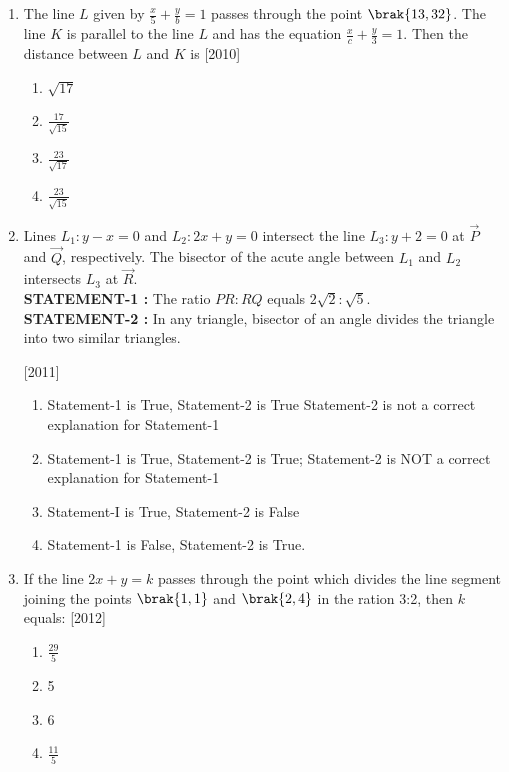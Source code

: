 \begin{enumerate}
\item The line $L$ given by $\frac{x}{5}+\frac{y}{b}=1$ passes through the point $\brak{13, 32}$. The line $K$ is parallel to the line $L$ and has the equation $\frac{x}{c}+\frac{y}{3}=1$. Then the distance between $L$ and $K$ is
\hfill{[2010]}
\begin{multicols}{4}
\begin{enumerate}
\item $\sqrt{17}$
\item $\frac{17}{\sqrt{15}}$
\item $\frac{23}{\sqrt{17}}$
\item $\frac{23}{\sqrt{15}}$
\end{enumerate}
\end{multicols} 

\item Lines $L_{1}: y-x=0$ and $L_{2}: 2x+y=0$ intersect the line $L_{3}: y+2=0$ at $\vec{P}$ and $\vec{Q}$, respectively. The bisector of the acute 
	angle between $L_{1}$ and $L_{2}$ intersects $L_{3}$ at $\vec{R}$.\\
\textbf{STATEMENT-1 :} The ratio $PR:RQ$ equals $2\sqrt{2}:\sqrt{5}$.\\
\textbf{STATEMENT-2 :} In any triangle, bisector of an angle divides the triangle into two similar triangles.

\hfill{[2011]}
   \begin{enumerate}
   \item Statement-1 is True, Statement-2 is True Statement-2 
is not a correct explanation for Statement-1 
   \item Statement-1 is True, Statement-2 is True; Statement-2 
is NOT a correct explanation for Statement-1 
   \item Statement-I is True, Statement-2 is False
   \item Statement-1 is False, Statement-2 is True. 
   \end{enumerate}

\item If the line $2x+y=k$ passes through the point which divides the line segment joining the points $\brak{1, 1}$ and $\brak{2, 4}$ in the ration 3:2, then $k$ equals: \hfill{[2012]}
\begin{multicols}{4}
\begin{enumerate}
\item $\frac{29}{5}$
\item 5
\item 6
\item $\frac{11}{5}$
\end{enumerate}
\end{multicols} 


\end{enumerate}
